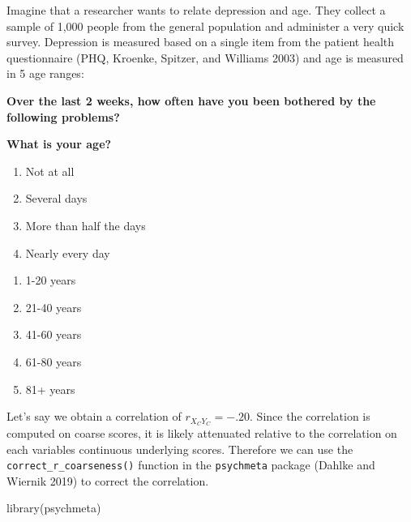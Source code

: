 \documentclass[
  letterpaper,
  DIV=11,
  numbers=noendperiod]{scrreprt}
\newenvironment{Shaded}{}{}
\newcommand{\FunctionTok}[1]{\textcolor[rgb]{0.39,0.29,0.61}{#1}}
\newcommand{\NormalTok}[1]{\textcolor[rgb]{0.12,0.11,0.11}{#1}}
\providecommand{\tightlist}{%
  \setlength{\itemsep}{0pt}\setlength{\parskip}{0pt}}\usepackage{longtable,booktabs,array}
\begin{document}
\begin{tcolorbox}[enhanced jigsaw, opacityback=0, coltitle=black, toprule=.15mm, colframe=quarto-callout-note-color-frame, bottomtitle=1mm, rightrule=.15mm, colbacktitle=quarto-callout-note-color!10!white, left=2mm, bottomrule=.15mm, breakable, title={Applied Example in R}, colback=white, opacitybacktitle=0.6, titlerule=0mm, arc=.35mm, leftrule=.75mm, toptitle=1mm]

Imagine that a researcher wants to relate depression and age. They
collect a sample of 1,000 people from the general population and
administer a very quick survey. Depression is measured based on a single
item from the patient health questionnaire (PHQ, Kroenke, Spitzer, and
Williams 2003) and age is measured in 5 age ranges:

\textbf{Over the last 2 weeks, how often have you been bothered by the
following problems?}

\textbf{What is your age?}

\begin{enumerate}
\def\labelenumi{\arabic{enumi}.}
\tightlist
\item
  Not at all
\item
  Several days
\item
  More than half the days
\item
  Nearly every day
\end{enumerate}

\begin{enumerate}
\def\labelenumi{\arabic{enumi}.}
\tightlist
\item
  1-20 years
\item
  21-40 years
\item
  41-60 years
\item
  61-80 years
\item
  81+ years
\end{enumerate}

Let's say we obtain a correlation of \(r_{X_C Y_C}=-.20\). Since the
correlation is computed on coarse scores, it is likely attenuated
relative to the correlation on each variables continuous underlying
scores. Therefore we can use the \texttt{correct\_r\_coarseness()}
function in the \texttt{psychmeta} package (Dahlke and Wiernik 2019) to
correct the correlation.

\begin{Shaded}
\begin{Highlighting}[]
\FunctionTok{library}\NormalTok{(psychmeta)}


\end{Highlighting}
\end{Shaded}
\end{tcolorbox}
\end{document}
